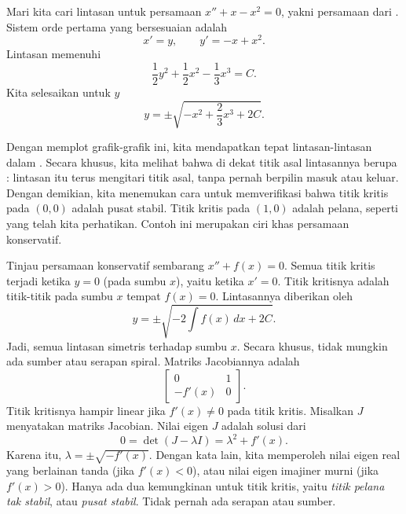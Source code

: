 \begin{example}
Mari kita cari lintasan untuk persamaan $x'' + x-x^2 = 0$,
yakni persamaan dari
. Sistem orde pertama
yang bersesuaian adalah
\begin{equation*}
x' = y , \qquad y' = -x+x^2 .
\end{equation*}
Lintasan memenuhi
\begin{equation*}
\frac{1}{2} y^2  + \frac{1}{2} x^2 - \frac{1}{3} x^3  = C .
\end{equation*}
Kita selesaikan untuk $y$
\begin{equation*}
y = \pm \sqrt{-x^2 + \frac{2}{3} x^3  + 2C} .
\end{equation*}

Dengan memplot grafik-grafik ini, kita mendapatkan tepat lintasan-lintasan dalam
. Secara khusus, kita melihat bahwa di dekat titik asal
lintasannya berupa \emph{}: lintasan itu terus
mengitari titik asal, tanpa pernah berpilin masuk atau keluar. Dengan demikian, kita menemukan cara
untuk memverifikasi bahwa titik kritis pada $(0,0)$ adalah pusat stabil.
Titik kritis pada $(1,0)$ adalah pelana, seperti yang telah kita perhatikan.
Contoh ini merupakan ciri khas persamaan konservatif.
\end{example}

Tinjau persamaan konservatif sembarang
$x'' + f(x) = 0$.
Semua titik kritis terjadi ketika $y=0$ (pada
sumbu $x$), yaitu ketika $x' = 0$. Titik kritisnya adalah
titik-titik pada sumbu $x$ tempat $f(x) = 0$.
Lintasannya diberikan oleh
\begin{equation*}
y = \pm \sqrt{ - 2 \int f(x)\, dx + 2C} .
\end{equation*}
Jadi, semua lintasan simetris terhadap sumbu $x$. Secara khusus,
tidak mungkin ada sumber atau serapan spiral.
Matriks Jacobiannya adalah
\begin{equation*}
\begin{bmatrix}
0 & 1 \\
-f'(x) & 0
\end{bmatrix} .
\end{equation*}
Titik kritisnya hampir linear jika $f'(x) \neq 0$ pada titik
kritis. Misalkan $J$ menyatakan matriks Jacobian.
Nilai eigen $J$ adalah solusi dari
\begin{equation*}
0 = \det(J - \lambda I) = \lambda^2 + f'(x) .
\end{equation*}
Karena itu, $\lambda = \pm \sqrt{-f'(x)}$. Dengan kata lain, kita memperoleh
nilai eigen real yang berlainan tanda (jika $f'(x) < 0$),
atau nilai eigen imajiner murni (jika $f'(x) > 0$).
Hanya ada dua kemungkinan untuk titik kritis, yaitu \emph{titik pelana
tak stabil}, atau \emph{pusat stabil}.
Tidak pernah ada serapan atau sumber.

